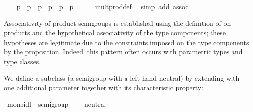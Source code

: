 \begin{isabellebody}
\ \ \isamarkupfalse%
\ {}p\ {}\ p\ {}\ p\ {}\ p\ {}\ {}p\ {}\ p\isanewline
\ \ \ \ \isamarkupfalse%
\ mult{}prod{}def\ \isamarkupfalse%
\ {}simp\ add{}\ assoc{}\isanewline
{}\isamarkupfalse%
\ \ \ \ \ \ \isanewline
\isanewline
{}\isamarkupfalse%
%
\endisatagquote
{\isafoldquote}%
%
\isadelimquote
%
\endisadelimquote
%
\begin{isamarkuptext}%
\noindent Associativity of product semigroups is established using
  the definition of  on products and the hypothetical
  associativity of the type components; these hypotheses are
  legitimate due to the  constraints imposed on the
  type components by the \hyperlink{command.instance}{\mbox{}} proposition.  Indeed,
  this pattern often occurs with parametric types and type classes.%
\end{isamarkuptext}%
\isamarkuptrue%
%
\isamarkuptrue%
%
\begin{isamarkuptext}%
We define a subclass  (a semigroup with a left-hand
  neutral) by extending  with one additional
  parameter  together with its characteristic property:%
\end{isamarkuptext}%
\isamarkuptrue%
%
\isadelimquote
%
\endisadelimquote
%
\isatagquote
{}\isamarkupfalse%
\ monoidl\ {}\ semigroup\ {}\isanewline
\ \ \ neutral\ {}{}\ {}{}{}\ {}{}{}{}{}\isanewline

\end{isabellebody}
